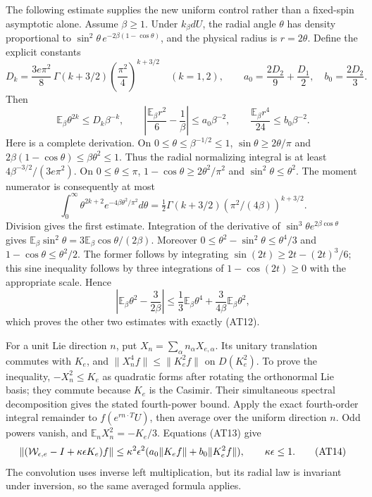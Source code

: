 \documentclass[11pt]{article}
\begin{document}
The following estimate supplies the new uniform control rather than a fixed-spin asymptotic alone. Assume \(\beta\ge1\). Under \(k_\beta dU\), the radial angle \(\theta\) has density proportional to
\(\sin^2\theta\,e^{-2\beta(1-\cos\theta)}\), and the physical radius is \(r=2\theta\). Define the explicit constants
\[
 D_k=\frac{3e\pi^2}{8}\,
       \Gamma(k+3/2)\left(\frac{\pi^2}{4}\right)^{k+3/2}
       \quad(k=1,2),\qquad
 a_0=\frac{2D_2}{9}+\frac{D_1}{2},\quad b_0=\frac{2D_2}{3}.
 \tag{AT12}
\]
Then
\[
 \mathbb E_\beta\theta^{2k}\le D_k\beta^{-k},\qquad
 \left|\frac{\mathbb E_\beta r^2}{6}-\frac1\beta\right|
           \le a_0\beta^{-2},\qquad
 \frac{\mathbb E_\beta r^4}{24}\le b_0\beta^{-2}.
 \tag{AT13}
\]
Here is a complete derivation. On \(0\le\theta\le\beta^{-1/2}\le1\),
\(\sin\theta\ge2\theta/\pi\) and
\(2\beta(1-\cos\theta)\le\beta\theta^2\le1\).
Thus the radial normalizing integral is at least
\(4\beta^{-3/2}/(3e\pi^2)\).
On \(0\le\theta\le\pi\),
\(1-\cos\theta\ge2\theta^2/\pi^2\) and \(\sin^2\theta\le\theta^2\).
The moment numerator is consequently at most
\[
 \int_0^\infty\theta^{2k+2}e^{-4\beta\theta^2/\pi^2}d\theta
 =\tfrac12\Gamma(k+3/2)
                 (\pi^2/(4\beta))^{k+3/2}.
\]
Division gives the first estimate. Integration of the derivative of
\(\sin^3\theta e^{2\beta\cos\theta}\) gives
\(\mathbb E_\beta\sin^2\theta=3\mathbb E_\beta\cos\theta/(2\beta)\).
Moreover
\(0\le\theta^2-\sin^2\theta\le\theta^4/3\) and
\(1-\cos\theta\le\theta^2/2\).
The former follows by integrating
\(\sin(2t)\ge2t-(2t)^3/6\); this sine inequality follows by three integrations of \(1-\cos(2t)\ge0\) with the appropriate scale. Hence
\[
 \left|\mathbb E_\beta\theta^2-\frac3{2\beta}\right|
 \le\frac13\mathbb E_\beta\theta^4
               +\frac3{4\beta}\mathbb E_\beta\theta^2,
\]
which proves the other two estimates with exactly (AT12).

For a unit Lie direction \(n\), put \(X_n=\sum_\alpha n_\alpha X_{e,\alpha}\). Its unitary translation commutes with \(K_e\), and
\(\|X_n^4f\|\le\|K_e^2f\|\) on \(D(K_e^2)\). To prove the inequality, \(-X_n^2\le K_e\) as quadratic forms after rotating the orthonormal Lie basis; they commute because \(K_e\) is the Casimir. Their simultaneous spectral decomposition gives the stated fourth-power bound.
Apply the exact fourth-order integral remainder to \(f(e^{rn\cdot T}U)\), then average over the uniform direction \(n\). Odd powers vanish, and
\(\mathbb E_nX_n^2=-K_e/3\). Equations (AT13) give
\[
 \|({\cal W}_{\epsilon,e}-I+\kappa\epsilon K_e)f\|
 \le\kappa^2\epsilon^2
               (a_0\|K_ef\|+b_0\|K_e^2f\|),
 \qquad \kappa\epsilon\le1.
 \tag{AT14}
\]
The convolution uses inverse left multiplication, but its radial law is invariant under inversion, so the same averaged formula applies.
\end{document}
